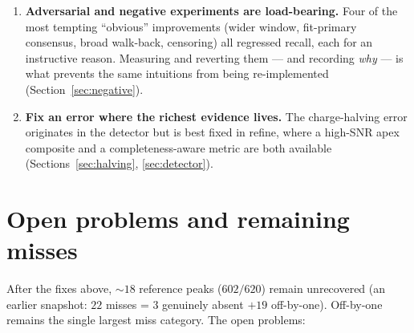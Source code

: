 \documentclass[11pt]{article}
\begin{document}
\begin{enumerate}[leftmargin=1.6em,label=\textbf{\arabic*.}]
  \item \textbf{Adversarial and negative experiments are load-bearing.} Four of the most tempting
  ``obvious'' improvements (wider window, fit-primary consensus, broad walk-back, censoring) all
  regressed recall, each for an instructive reason. Measuring and reverting them --- and recording
  \emph{why} --- is what prevents the same intuitions from being re-implemented (Section~\ref{sec:negative}).
  \item \textbf{Fix an error where the richest evidence lives.} The charge-halving error originates
  in the detector but is best fixed in refine, where a high-SNR apex composite and a
  completeness-aware metric are both available (Sections~\ref{sec:halving}, \ref{sec:detector}).
\end{enumerate}

\section{Open problems and remaining misses}
\label{sec:open}

After the fixes above, $\sim 18$ reference peaks ($602/620$) remain unrecovered (an earlier snapshot:
$22$ misses = $3$ genuinely absent $+ 19$ off-by-one). Off-by-one remains the single largest miss
category. The open problems:
\end{document}
